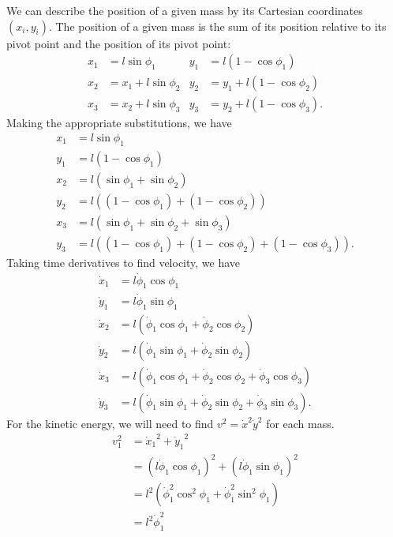\documentclass{article}
\begin{document}
\begin{appendices}
    We can describe the position of a given mass by its Cartesian coordinates
    $(x_i, y_i)$.  The position of a given mass is the sum of its position
    relative to its pivot point and the position of its pivot point:
    \begin{align}
        x_1 &= l\sin\phi_1     & y_1 &= l(1-\cos\phi_1) \\
        x_2 &= x_1+l\sin\phi_2 & y_2 &= y_1 + l(1-\cos\phi_2) \\
        x_3 &= x_2+l\sin\phi_3 & y_3 &= y_2 + l(1-\cos\phi_3).
    \end{align}
    Making the appropriate substitutions, we have
    \begin{align}
        x_1 &= l\sin\phi_1     \\
        y_1 &= l(1-\cos\phi_1) \\
        x_2 &= l(\sin\phi_1+\sin\phi_2)  \\
        y_2 &= l((1-\cos\phi_1)+(1-\cos\phi_2)) \\
        x_3 &= l(\sin\phi_1+\sin\phi_2+\sin\phi_3)  \\
        y_3 &= l((1-\cos\phi_1)+(1-\cos\phi_2)+(1-\cos\phi_3)).
    \end{align}
    Taking time derivatives to find velocity, we have
    \begin{align}
        \dot x_1 &= l\dot\phi_1\cos\phi_1 \\
        \dot y_1 &= l\dot\phi_1\sin\phi_1 \\
        \dot x_2 &= l(\dot\phi_1\cos\phi_1+\dot\phi_2\cos\phi_2) \\
        \dot y_2 &= l(\dot\phi_1\sin\phi_1+\dot\phi_2\sin\phi_2) \\
        \dot x_3 &= l(\dot\phi_1\cos\phi_1+\dot\phi_2\cos\phi_2
            +\dot\phi_3\cos\phi_3) \\
        \dot y_3 &= l(\dot\phi_1\sin\phi_1+\dot\phi_2\sin\phi_2
            +\dot\phi_3\sin\phi_3).
    \end{align}
    For the kinetic energy, we will need to find $v^2={\dot x}^2{\dot y}^2$ for
    each mass. 
    \begin{align}
        v_1^2 &= {\dot x_1}^2+{\dot y_1}^2 \\
        &= (l\dot\phi_1\cos\phi_1)^2
            +(l\dot\phi_1\sin\phi_1)^2 \\
        &= l^2(\dot\phi_1^2\cos^2\phi_1+\dot\phi_1^2\sin^2\phi_1) \\
        &= l^2\dot\phi_1^2 \\\\

\end{align}
\end{appendices}
\end{document}
